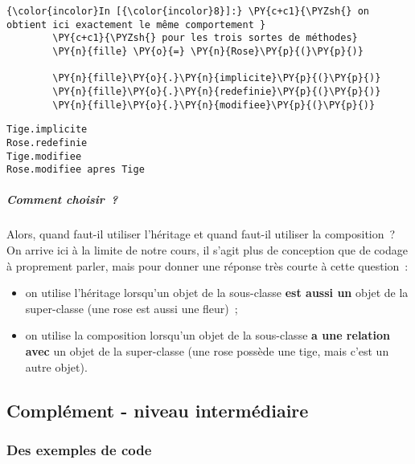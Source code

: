     \begin{Verbatim}[commandchars=\\\{\},frame=single,framerule=0.3mm,rulecolor=\color{cellframecolor}]
{\color{incolor}In [{\color{incolor}8}]:} \PY{c+c1}{\PYZsh{} on obtient ici exactement le même comportement }
        \PY{c+c1}{\PYZsh{} pour les trois sortes de méthodes}
        \PY{n}{fille} \PY{o}{=} \PY{n}{Rose}\PY{p}{(}\PY{p}{)}
        
        \PY{n}{fille}\PY{o}{.}\PY{n}{implicite}\PY{p}{(}\PY{p}{)}
        \PY{n}{fille}\PY{o}{.}\PY{n}{redefinie}\PY{p}{(}\PY{p}{)}
        \PY{n}{fille}\PY{o}{.}\PY{n}{modifiee}\PY{p}{(}\PY{p}{)}
\end{Verbatim}


    \begin{Verbatim}[commandchars=\\\{\},frame=single,framerule=0.3mm,rulecolor=\color{cellframecolor}]
Tige.implicite
Rose.redefinie
Tige.modifiee
Rose.modifiee apres Tige
\end{Verbatim}

    \hypertarget{comment-choisir}{%
\subparagraph{Comment choisir~?}\label{comment-choisir}}

    Alors, quand faut-il utiliser l'héritage et quand faut-il utiliser la
composition~?\\
On arrive ici à la limite de notre cours, il s'agit plus de conception
que de codage à proprement parler, mais pour donner une réponse très
courte à cette question~:

\begin{itemize}
\tightlist
\item
  on utilise l'héritage lorsqu'un objet de la sous-classe \textbf{est
  aussi un} objet de la super-classe (une rose est aussi une fleur)~;
\item
  on utilise la composition lorsqu'un objet de la sous-classe \textbf{a
  une relation avec} un objet de la super-classe (une rose possède une
  tige, mais c'est un autre objet).
\end{itemize}

    \hypertarget{compluxe9ment---niveau-intermuxe9diaire}{%
\subsection{Complément - niveau
intermédiaire}\label{compluxe9ment---niveau-intermuxe9diaire}}

    \hypertarget{des-exemples-de-code}{%
\subsubsection{Des exemples de code}\label{des-exemples-de-code}}

